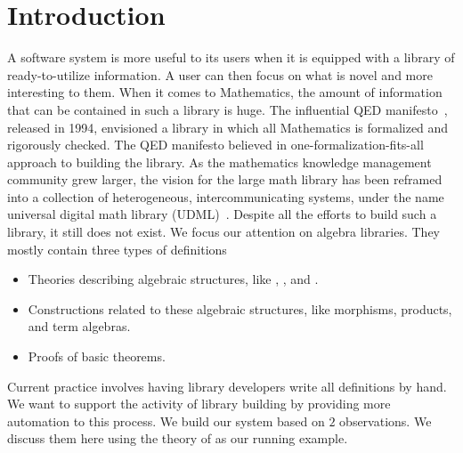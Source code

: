 \chapter{Introduction}



A software system is more useful to its users when it is equipped with a library of ready-to-utilize information. A user can then focus on what is novel and more interesting to them. When it comes to Mathematics, the amount of information that can be contained in such a library is huge. The influential QED manifesto~\cite{boyer1994qed}, released in 1994, envisioned a library in which all Mathematics is formalized and rigorously checked. The QED manifesto believed in one-formalization-fits-all approach to building the library. 
As the mathematics knowledge management community grew larger, the vision for the large math library has been reframed into a collection of heterogeneous, intercommunicating systems, under the name universal digital math library (UDML)~\cite{farmer2004mkm}. Despite all the efforts to build such a library, it still does not exist. We focus our attention on algebra libraries. They mostly contain three types of definitions 
\begin{itemize}
    \item Theories describing algebraic structures, like , , and . 
    \item Constructions related to these algebraic structures, like morphisms, products, and term algebras.  
    \item Proofs of basic theorems. 
\end{itemize}

Current practice involves having library developers write all definitions by hand. We want to support the activity of library building by providing more automation to this process. We build our system based on $2$ observations. We discuss them here using the theory of  as our running example.  

